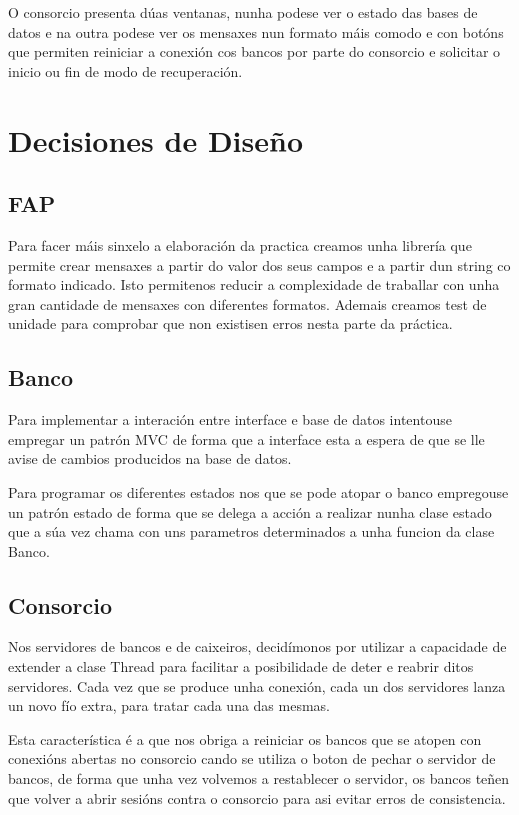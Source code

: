 \documentclass[a4paper,titlepage]{article}
\begin{document}
O consorcio presenta dúas ventanas, nunha podese ver o estado das bases de datos e na outra podese ver os mensaxes nun formato máis comodo e con botóns que permiten reiniciar a conexión cos bancos por parte do consorcio e solicitar o inicio ou fin de modo de recuperación.


\section{Decisiones de Diseño}
\subsection {FAP}
Para facer máis sinxelo a elaboración da practica creamos unha librería que permite crear mensaxes a partir do valor dos seus campos e a partir dun string co formato indicado. Isto permitenos reducir a complexidade de traballar con unha gran cantidade de mensaxes con diferentes formatos. Ademais creamos test de unidade para comprobar que non existisen erros nesta parte da práctica.

\subsection {Banco}
Para implementar a interación entre interface e base de datos intentouse empregar un patrón MVC de forma que a interface esta a espera de que se lle avise de cambios producidos na base de datos.

Para programar os diferentes estados nos que se pode atopar o banco empregouse un patrón estado de forma que se delega a acción a realizar nunha clase estado que a súa vez chama con uns parametros determinados a unha funcion da clase Banco.


\subsection {Consorcio}
Nos servidores de bancos e de caixeiros, decidímonos por utilizar a capacidade de extender a clase Thread para facilitar a posibilidade de deter e reabrir ditos servidores. Cada vez que se produce unha conexión, cada un dos servidores lanza un novo fío extra, para tratar cada una das mesmas.

Esta característica é a que nos obriga a reiniciar os bancos que se atopen con conexións abertas no consorcio cando se utiliza o boton de pechar o servidor de bancos, de forma que unha vez volvemos a restablecer o servidor, os bancos teñen que volver a abrir sesións contra o consorcio para asi evitar erros de consistencia.
\end{document}
